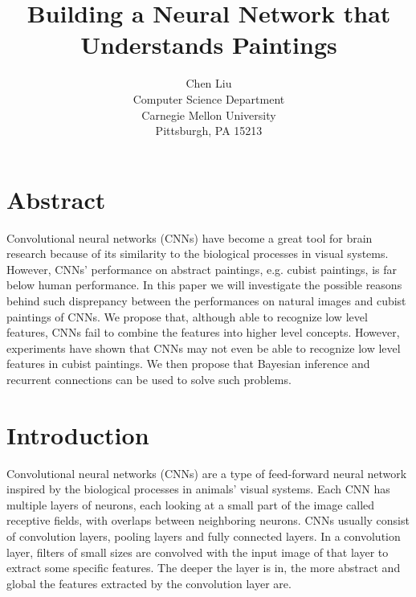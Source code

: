 \documentclass[11pt]{article}
\begin{document}
\date{}

\title{\Large\bf Building a Neural Network that Understands Paintings}

\author{Chen Liu \\
 Computer Science Department \\
 Carnegie Mellon University \\
 Pittsburgh, PA 15213}

\maketitle

\section*{\centering Abstract}

\begin{addmargin}[3em]{3em}
Convolutional neural networks (CNNs) have become a great tool for brain research because of its similarity to the biological processes in visual systems. However, CNNs' performance on abstract paintings, e.g. cubist paintings, is far below human performance. In this paper we will investigate the possible reasons behind such disprepancy between the performances on natural images and cubist paintings of CNNs. We propose that, although able to recognize low level features, CNNs fail to combine the features into higher level concepts. However, experiments have shown that CNNs may not even be able to recognize low level features in cubist paintings. We then propose that Bayesian inference and recurrent connections can be used to solve such problems.
\end{addmargin}

\section{Introduction}

Convolutional neural networks (CNNs) are a type of feed-forward neural network inspired by the biological processes in animals' visual systems. Each CNN has multiple layers of neurons, each looking at a small part of the image called receptive fields, with overlaps between neighboring neurons. CNNs usually consist of convolution layers, pooling layers and fully connected layers. In a convolution layer, filters of small sizes are convolved with the input image of that layer to extract some specific features. The deeper the layer is in, the more abstract and global the features extracted by the convolution layer are.\\
\end{document}
